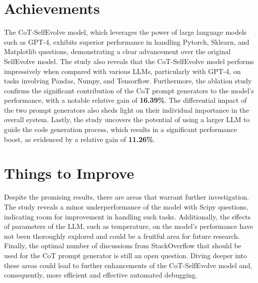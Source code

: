 \documentclass[a4paper,oneside]{book}
\begin{document}
\section{Achievements}
The CoT-SelfEvolve model, which leverages the power of large language models such as GPT-4, exhibits superior performance in handling Pytorch, Sklearn, and Matplotlib questions, demonstrating a clear advancement over the original SelfEvolve model. The study also reveals that the CoT-SelfEvolve model performs impressively when compared with various LLMs, particularly with GPT-4, on tasks involving Pandas, Numpy, and Tensorflow. Furthermore, the ablation study confirms the significant contribution of the CoT prompt generators to the model's performance, with a notable relative gain of \textbf{16.39\%}. The differential impact of the two prompt generators also sheds light on their individual importance in the overall system. Lastly, the study uncovers the potential of using a larger LLM to guide the code generation process, which results in a significant performance boost, as evidenced by a relative gain of \textbf{11.26\%}.

\section{Things to Improve}
Despite the promising results, there are areas that warrant further investigation. The study reveals a minor underperformance of the model with Scipy questions, indicating room for improvement in handling such tasks. Additionally, the effects of parameters of the LLM, such as temperature, on the model's performance have not been thoroughly explored and could be a fruitful area for future research. Finally, the optimal number of discussions from StackOverflow that should be used for the CoT prompt generator is still an open question. Diving deeper into these areas could lead to further enhancements of the CoT-SelfEvolve model and, consequently, more efficient and effective automated debugging.

\sloppy
\printbibliography[heading=subbibintoc,type=article,title=References]
\end{document}
